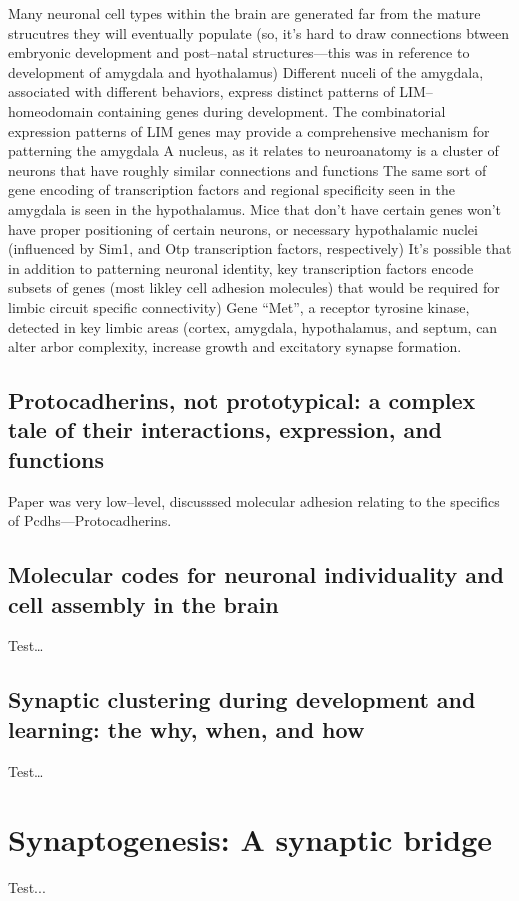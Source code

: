 \documentclass[11pt, a4paper, oneside]{article}   	%
\begin{document}
\begin{outline}
  \point Many neuronal cell types within the brain are generated far from the mature strucutres they will eventually populate (so, it's hard to draw connections btween embryonic development and post--natal structures---this was in reference to development of amygdala and hyothalamus)
  \point Different nuceli of the amygdala, associated with different behaviors, express distinct patterns of LIM--homeodomain containing genes during development.
    \subpoint The combinatorial expression patterns of LIM genes may provide a comprehensive mechanism for patterning the amygdala
    \subpoint A nucleus, as it relates to neuroanatomy is a cluster of neurons that have roughly similar connections and functions
  \point The same sort of gene encoding of transcription factors and regional specificity seen in the amygdala is seen in the hypothalamus.
  \point Mice that don't have certain genes won't have proper positioning of certain neurons, or necessary hypothalamic nuclei (influenced by Sim1, and Otp transcription factors, respectively)
  \point It's possible that in addition to patterning neuronal identity, key transcription factors encode subsets of genes (most likley cell adhesion molecules) that would be required for limbic circuit specific connectivity)
  \point Gene ``Met'', a receptor tyrosine kinase, detected in key limbic areas (cortex, amygdala, hypothalamus, and septum, can alter arbor complexity, increase growth and excitatory synapse formation. 

\end{outline}


  


\subsection{Protocadherins, not prototypical: a complex tale of their interactions, expression, and functions}

Paper was very low--level, discusssed molecular adhesion relating to the specifics of Pcdhs---Protocadherins.

\subsection{Molecular codes for neuronal individuality and cell assembly in the brain}

Test\ldots

\subsection{Synaptic clustering during development and learning: the why, when, and how}

Test\ldots

\section{Synaptogenesis: A synaptic bridge \cite{Yates2016}}

Test...





\end{document}
